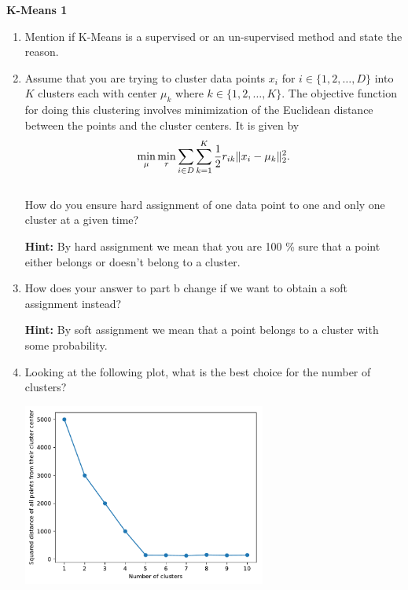 \begin{Q}
\textbf{\Large K-Means 1}\\

\begin{enumerate}

\item Mention if K-Means is a supervised or an un-supervised method and state the reason.

\item Assume that you are trying to cluster data points $x_{i}$  for $ i \in \{1,2, \dots, D\}$ into $K$ clusters each with center $\mu_{k}$  where $ k \in \{1,2, \dots, K \}$. The objective function for doing this clustering involves minimization of the Euclidean distance between the points and the cluster centers. It is given by  \begin{equation*}
\min\limits_{\mu} \min\limits_{r}\sum\limits_{i \in D} \sum\limits_{k =1}^{K} \frac{1}{2} r_{ik} \|x_{i} -\mu_{k}\|_{2}^{2}. \\
 \end{equation*} \\ How do you ensure hard assignment of one data point to one and only one cluster at a given time?
 
 \textbf{Hint:} By hard assignment we mean that you are 100 \% sure that a point either belongs or doesn't belong to a cluster.
 
 \item How does your answer to part b change if we want to obtain a soft assignment instead?
 
 \textbf{Hint:} By soft assignment we mean that  a point  belongs to a cluster with some probability.
 
 \item Looking at the following plot, what is the best choice for the number of clusters?
 \begin{center}
 \includegraphics[width=8cm]{figs/cluster.pdf}
 \end{center}
 

\end{enumerate}
\end{Q}

